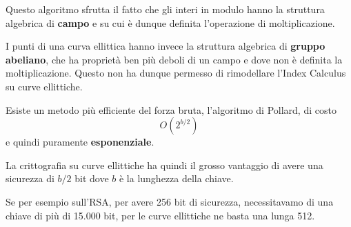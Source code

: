 Questo algoritmo sfrutta il fatto che gli interi in modulo hanno la struttura algebrica di \textbf{campo} e su cui
\`e dunque definita l'operazione di moltiplicazione.

I punti di una curva ellittica hanno invece la struttura algebrica di \textbf{gruppo abeliano}, che ha propriet\`a
ben pi\`u deboli di un campo e dove non \`e definita la moltiplicazione. Questo non ha dunque permesso di
rimodellare l'Index Calculus su curve ellittiche.

Esiste un metodo pi\`u efficiente del forza bruta, l'algoritmo di Pollard, di costo
\[ O(2^{b/2}) \]
e quindi puramente \textbf{esponenziale}.

La crittografia su curve ellittiche ha quindi il grosso vantaggio di avere una sicurezza di $b/2$ bit dove $b$ \`e
la lunghezza della chiave.

Se per esempio sull'RSA, per avere 256 bit di sicurezza, necessitavamo di una chiave di pi\`u di 15.000 bit, per le
curve ellittiche ne basta una lunga 512.